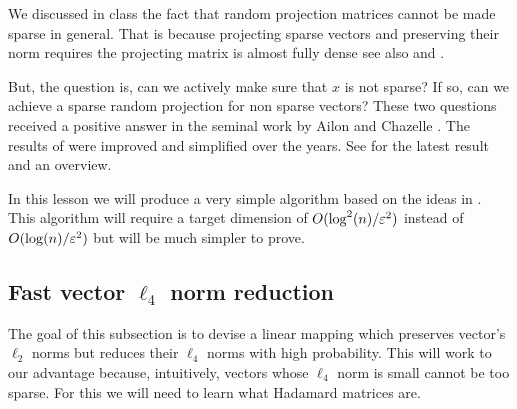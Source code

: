 \documentclass{article}
\begin{document}

We discussed in class the fact that random projection matrices cannot be made sparse in general.
That is because projecting sparse vectors and preserving their norm requires the projecting matrix is almost fully dense see also \cite{JelaniH2012} and \cite{KaneN12}.

But, the question is, can we actively make sure that $x$ is not sparse? If so, can we achieve a sparse random projection for non sparse vectors?
These two questions received a positive answer in the seminal work by Ailon and Chazelle \cite{AilonCh06}.
The results of \cite{AilonCh06} were improved and simplified over the years. See \cite{AilonL11} for the latest result and an overview.

In this lesson we will produce a very simple algorithm based on the ideas in \cite{AilonCh06}.
This algorithm will require a target dimension of $O(\log^2(n)/\varepsilon^2)$ instead of $O(\log(n)/\varepsilon^2)$ but will be much simpler to prove.

\subsection{Fast vector $\ell_4$ norm reduction}
The goal of this subsection is to devise a linear mapping which preserves vector's $\ell_2$ norms but reduces their $\ell_4$ norms with high probability.
This will work to our advantage because, intuitively, vectors whose $\ell_4$ norm is small cannot be too sparse.
For this we will need to learn what Hadamard matrices are.
\end{document}
